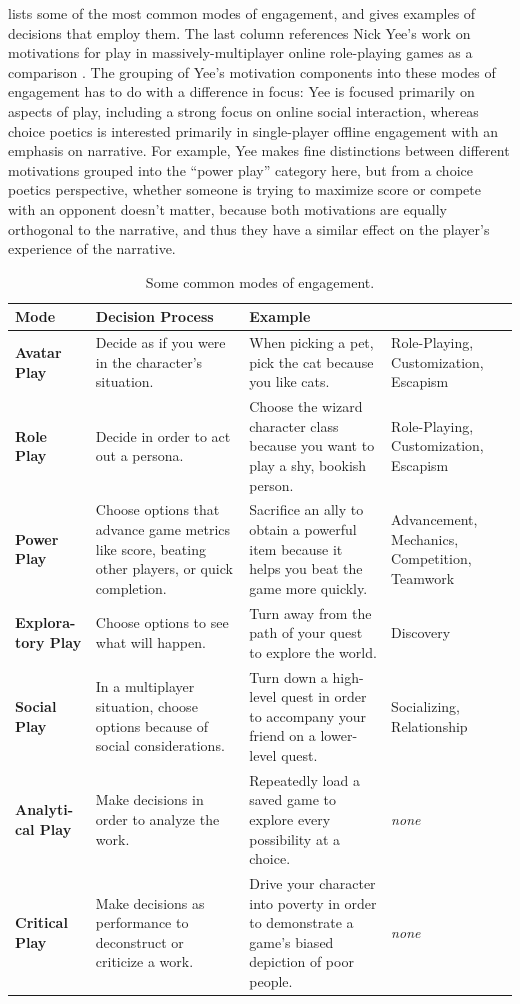  lists some of the most common modes of engagement, and gives examples of decisions that employ them.
%
The last column references Nick Yee's work on motivations for play in massively-multiplayer online role-playing games as a comparison \citep{Yee2006}.
%
The grouping of Yee's motivation components into these modes of engagement has to do with a difference in focus: Yee is focused primarily on aspects of play, including a strong focus on online social interaction, whereas choice poetics is interested primarily in single-player offline engagement with an emphasis on narrative.
%
For example, Yee makes fine distinctions between different motivations grouped into the ``power play'' category here, but from a choice poetics perspective, whether someone is trying to maximize score or compete with an opponent doesn't matter, because both motivations are equally orthogonal to the narrative, and thus they have a similar effect on the player's experience of the narrative.


\begin{table}[!p]
\begingroup
\renewcommand*{\arraystretch}{1.5}
\begin{tabular}{p{5em}p{10em}p{10em}p{6.9em}}
\toprule
\textbf{Mode} & \textbf{Decision Process} & \textbf{Example} & \textbf{\citep{Yee2006}} \\
\midrule
\textbf{Avatar Play} & Decide as if you were in the character's situation. & When picking a pet, pick the cat because you like cats. & Role-Playing, Customization, Escapism \\
\textbf{Role Play} & Decide in order to act out a persona. & Choose the wizard character class because you want to play a shy, bookish person. & Role-Playing, Customization, Escapism \\
\textbf{Power Play} & Choose options that advance game metrics like score, beating other players, or quick completion. & Sacrifice an ally to obtain a powerful item because it helps you beat the game more quickly. & Advancement, Mechanics, Competition, Teamwork \\
\textbf{Explora-tory Play} & Choose options to see what will happen. & Turn away from the path of your quest to explore the world. & Discovery \\
\textbf{Social Play} & In a multiplayer situation, choose options because of social considerations. & Turn down a high-level quest in order to accompany your friend on a lower-level quest. & Socializing, \newline Relationship \\
\textbf{Analyti-cal Play} & Make decisions in order to analyze the work. & Repeatedly load a saved game to explore every possibility at a choice. & \emph{none} \\
\textbf{Critical Play} & Make decisions as performance to deconstruct or criticize a work. & Drive your character into poverty in order to demonstrate a game's biased depiction of poor people. & \emph{none} \\
\bottomrule
\end{tabular}
\endgroup
\caption[Modes of engagement]{Some common modes of engagement.}
\label{tab:modes-of-engagement}
\end{table}

